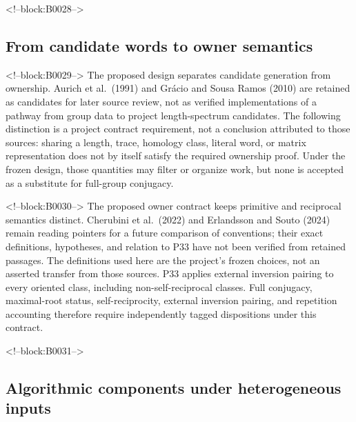 \documentclass[11pt,a4paper]{article}
\begin{document}
<!--block:B0028-->
\hypertarget{from-candidate-words-to-owner-semantics}{%
\subsection{From candidate words to owner semantics}\label{from-candidate-words-to-owner-semantics}}

<!--block:B0029-->
The proposed design separates candidate generation from ownership. Aurich et al.~(1991)
\citep{P33-S05}
 and Grácio and Sousa Ramos (2010)
\citep{P33-S09}
 are retained as candidates for later source review, not as verified implementations of a pathway from group data to project length-spectrum candidates. The following distinction is a project contract requirement, not a conclusion attributed to those sources: sharing a length, trace, homology class, literal word, or matrix representation does not by itself satisfy the required ownership proof. Under the frozen design, those quantities may filter or organize work, but none is accepted as a substitute for full-group conjugacy.

<!--block:B0030-->
The proposed owner contract keeps primitive and reciprocal semantics distinct. Cherubini et al.~(2022)
\citep{P33-S14}
 and Erlandsson and Souto (2024)
\citep{P33-S15}
 remain reading pointers for a future comparison of conventions; their exact definitions, hypotheses, and relation to P33 have not been verified from retained passages. The definitions used here are the project's frozen choices, not an asserted transfer from those sources. P33 applies external inversion pairing to every oriented class, including non-self-reciprocal classes. Full conjugacy, maximal-root status, self-reciprocity, external inversion pairing, and repetition accounting therefore require independently tagged dispositions under this contract.

<!--block:B0031-->
\hypertarget{algorithmic-components-under-heterogeneous-inputs}{%
\subsection{Algorithmic components under heterogeneous inputs}\label{algorithmic-components-under-heterogeneous-inputs}}
\end{document}
